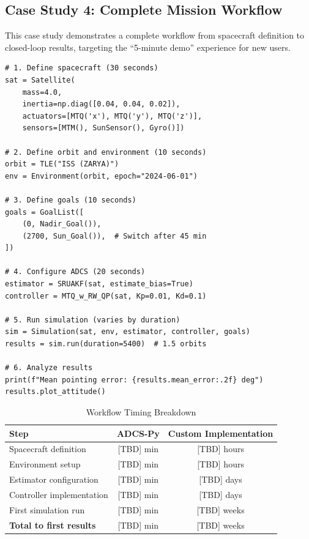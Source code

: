 \documentclass[conference]{IEEEtran}
\begin{document}

\subsection{Case Study 4: Complete Mission Workflow}\label{subsec:case4}

This case study demonstrates a complete workflow from spacecraft definition to closed-loop results, targeting the ``5-minute demo'' experience for new users.

\begin{lstlisting}[caption={Complete mission workflow example}]
# 1. Define spacecraft (30 seconds)
sat = Satellite(
    mass=4.0,
    inertia=np.diag([0.04, 0.04, 0.02]),
    actuators=[MTQ('x'), MTQ('y'), MTQ('z')],
    sensors=[MTM(), SunSensor(), Gyro()])

# 2. Define orbit and environment (10 seconds)
orbit = TLE("ISS (ZARYA)")
env = Environment(orbit, epoch="2024-06-01")

# 3. Define goals (10 seconds)
goals = GoalList([
    (0, Nadir_Goal()),
    (2700, Sun_Goal()),  # Switch after 45 min
])

# 4. Configure ADCS (20 seconds)
estimator = SRUAKF(sat, estimate_bias=True)
controller = MTQ_w_RW_QP(sat, Kp=0.01, Kd=0.1)

# 5. Run simulation (varies by duration)
sim = Simulation(sat, env, estimator, controller, goals)
results = sim.run(duration=5400)  # 1.5 orbits

# 6. Analyze results
print(f"Mean pointing error: {results.mean_error:.2f} deg")
results.plot_attitude()
\end{lstlisting}

\begin{table}[t]
    \centering
    \caption{Workflow Timing Breakdown}
    \label{tab:workflow_timing}
    \begin{tabular}{lcc}
        \toprule
        Step & ADCS-Py & Custom Implementation \\
        \midrule
        Spacecraft definition & [TBD] min & [TBD] hours \\
        Environment setup & [TBD] min & [TBD] hours \\
        Estimator configuration & [TBD] min & [TBD] days \\
        Controller implementation & [TBD] min & [TBD] days \\
        First simulation run & [TBD] min & [TBD] weeks \\
        \midrule
        \textbf{Total to first results} & [TBD] min & [TBD] weeks \\
        \bottomrule
    \end{tabular}
\end{table}
\end{document}
